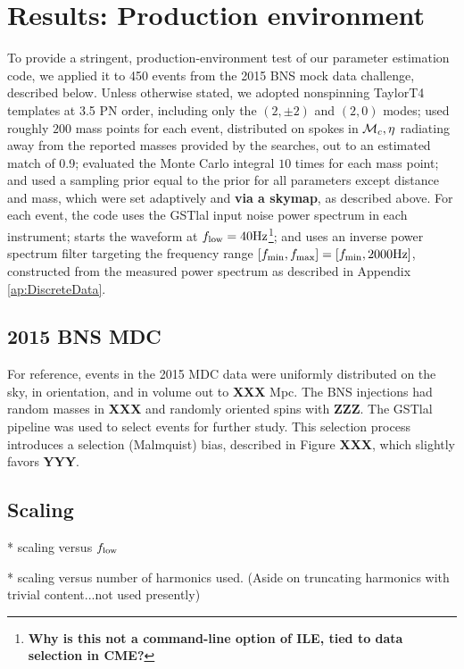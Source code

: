 \documentclass[twocolumn,prd,nofootinbib]{revtex4}
\newcommand\unit[1]{{\rm #1}}
\newcommand\mc{{{\cal M}_c}}
\newcommand\nEventsMDC{450}
\begin{document}
\section{Results: Production environment}

To provide a stringent, production-environment test of our parameter estimation code, we applied it to \nEventsMDC{}
events from the 2015 BNS mock data challenge, described below.  
%
Unless otherwise stated, we adopted nonspinning TaylorT4 templates at 3.5 PN order, including only the $(2,\pm 2)$ and
$(2,0)$ modes;  used roughly $200$ mass points for each event, distributed on spokes in $\mc,\eta$ radiating away from the reported
masses  provided by the searches, out to an estimated match of 0.9; 
 evaluated the Monte Carlo integral $10$ times for each mass point; and used a sampling prior equal to the prior for all
 parameters except distance and mass, which were set adaptively and \textbf{via a skymap}, as described above.  
For each event, the code uses the GSTlal input noise power spectrum in each instrument; starts the waveform at $f_{\rm
  low}=40\unit{Hz}$\footnote{ \textbf{Why is this not a command-line option of ILE, tied to data selection in CME?}};
and uses an inverse power spectrum filter targeting the frequency range $[f_{\rm min},f_{\rm max}]=[f_{\rm min},
  2000\unit{Hz}]$, constructed from the measured power spectrum as described in Appendix \ref{ap:DiscreteData}.  

\subsection{2015 BNS MDC}


For reference, events in the 2015 MDC data were uniformly distributed on the sky, in orientation, and in volume out to
\textbf{XXX} \unit{Mpc}.  The BNS injections had random masses in \textbf{XXX} and randomly oriented spins with
\textbf{ZZZ}.   The GSTlal pipeline was used to select events for further study.  This selection process introduces a selection (Malmquist) bias, described in Figure \textbf{XXX},
which slightly favors \textbf{YYY}.


\subsection{Scaling}

* scaling versus $f_{\rm low}$

* scaling versus number of harmonics used.  (Aside on truncating harmonics with trivial content...not used presently)
\end{document}
